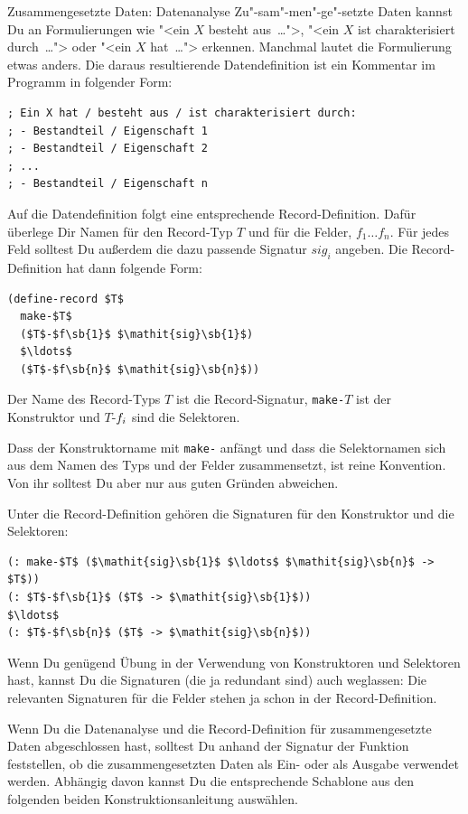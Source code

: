 \begin{konstruktionsanleitung}{Zusammengesetzte Daten: Datenanalyse}
  \label{ka:zusammengesetzt-datenanalyse}
Zu"-sam"-men"-ge"-setzte Daten kannst Du an Formulierungen wie "<ein $X$
besteht aus~\ldots">, "<ein $X$ ist charakterisiert durch~\ldots">
oder "<ein $X$ hat~\ldots"> erkennen.  Manchmal lautet die
Formulierung etwas anders.  Die daraus resultierende Datendefinition
ist ein Kommentar im Programm in folgender Form:
%
\begin{lstlisting}
; Ein X hat / besteht aus / ist charakterisiert durch:
; - Bestandteil / Eigenschaft 1
; - Bestandteil / Eigenschaft 2
; ...
; - Bestandteil / Eigenschaft n
\end{lstlisting}
%
Auf die Datendefinition folgt eine entsprechende Record-Definition.
Dafür überlege Dir Namen für den Record-Typ $T$ und für die
Felder, $f_1 \ldots f_n$.  Für jedes Feld solltest Du außerdem
die dazu passende Signatur $\mathit{sig}_{i}$ angeben.
Die Record-Definition hat dann folgende
Form:
%
\begin{lstlisting}
(define-record $T$
  make-$T$
  ($T$-$f\sb{1}$ $\mathit{sig}\sb{1}$)
  $\ldots$
  ($T$-$f\sb{n}$ $\mathit{sig}\sb{n}$))
\end{lstlisting}
%
Der Name des Record-Typs \(T\) ist die Record-Signatur,
\lstinline{make-}\(T\) ist der Konstruktor und \(T\)-\(f\sb{i}\)
sind die Selektoren.

Dass der Konstruktorname mit \lstinline{make-} anfängt und dass die
Selektornamen sich aus dem Namen des Typs und der Felder
zusammensetzt, ist reine Konvention.  Von ihr solltest Du aber nur aus
guten Gründen abweichen.

Unter die Record-Definition gehören die Signaturen für den Konstruktor
und die Selektoren:
%
\begin{lstlisting}
(: make-$T$ ($\mathit{sig}\sb{1}$ $\ldots$ $\mathit{sig}\sb{n}$ -> $T$))
(: $T$-$f\sb{1}$ ($T$ -> $\mathit{sig}\sb{1}$))
$\ldots$
(: $T$-$f\sb{n}$ ($T$ -> $\mathit{sig}\sb{n}$))
\end{lstlisting}
%
\end{konstruktionsanleitung}
%
Wenn Du genügend Übung in der Verwendung von Konstruktoren und
Selektoren hast, kannst Du die Signaturen (die ja redundant sind)
auch weglassen: Die relevanten Signaturen für die Felder stehen ja
schon in der Record-Definition.

Wenn Du die Datenanalyse und die Record-Definition für
zusammengesetzte Daten abgeschlossen hast, solltest Du anhand der
Signatur der Funktion feststellen, ob die zusammengesetzten Daten als
Ein- oder als Ausgabe verwendet werden.  Abhängig davon kannst Du die
entsprechende Schablone aus den folgenden beiden
Konstruktionsanleitung auswählen.

